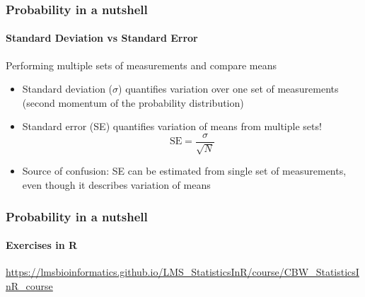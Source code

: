 \documentclass[aspectratio=43]{beamer}
\begin{document}
\begin{frame}

	\frametitle{Probability in a nutshell}
	\framesubtitle{Standard Deviation vs Standard Error}
	
	\footnotesize

	Performing multiple sets of measurements and compare means
	
	\begin{itemize}
		\item Standard deviation ($\sigma$) quantifies variation over one set of measurements (second momentum of the probability distribution)
		\item Standard error (SE) quantifies {\color{red}variation of means from multiple sets!}
		\begin{equation}
		\textrm{SE} = \frac{\sigma}{\sqrt{N}} \nonumber
		\end{equation}
		\item Source of confusion: SE can be estimated from single set of measurements,\\ even though it describes variation of means
	\end{itemize}

\end{frame}

\begin{frame}
	
	\frametitle{Probability in a nutshell}
	\framesubtitle{Exercises in R}
	
	\footnotesize

	\href{https://lmsbioinformatics.github.io/LMS_StatisticsInR/course/CBW_StatisticsInR_course.html}{https://lmsbioinformatics.github.io/LMS\_StatisticsInR/course/CBW\_StatisticsInR\_course}

\end{frame}

%
%

\begin{frame}


\end{frame}
\end{document}
